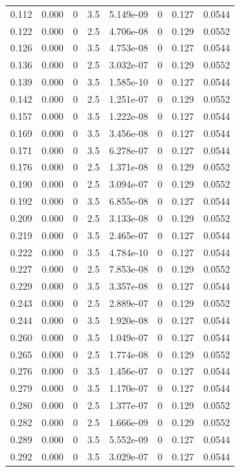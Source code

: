 \documentclass[preview]{standalone}
\begin{document}
{{\begin{tabular}{L{1.2cm}C{1.2cm} C{0.3cm}C{0.5cm} C{1.4cm}C{1.4cm} C{1.4cm}C{1.4cm}}
  0.112  &  0.000  & 0     & 3.5 &  5.149e-09  & 0  & 0.127 &  0.0544   \\ 
  0.122  &  0.000  & 0     & 2.5 &  4.706e-08  & 0  & 0.129 &  0.0552   \\ 
  0.126  &  0.000  & 0     & 3.5 &  4.753e-08  & 0  & 0.127 &  0.0544   \\ 
  0.136  &  0.000  & 0     & 2.5 &  3.032e-07  & 0  & 0.129 &  0.0552   \\ 
  0.139  &  0.000  & 0     & 3.5 &  1.585e-10  & 0  & 0.127 &  0.0544   \\ 
  0.142  &  0.000  & 0     & 2.5 &  1.251e-07  & 0  & 0.129 &  0.0552   \\ 
  0.157  &  0.000  & 0     & 3.5 &  1.222e-08  & 0  & 0.127 &  0.0544   \\ 
  0.169  &  0.000  & 0     & 3.5 &  3.456e-08  & 0  & 0.127 &  0.0544   \\ 
  0.171  &  0.000  & 0     & 3.5 &  6.278e-07  & 0  & 0.127 &  0.0544   \\ 
  0.176  &  0.000  & 0     & 2.5 &  1.371e-08  & 0  & 0.129 &  0.0552   \\ 
  0.190  &  0.000  & 0     & 2.5 &  3.094e-07  & 0  & 0.129 &  0.0552   \\ 
  0.192  &  0.000  & 0     & 3.5 &  6.855e-08  & 0  & 0.127 &  0.0544   \\ 
  0.209  &  0.000  & 0     & 2.5 &  3.133e-08  & 0  & 0.129 &  0.0552   \\ 
  0.219  &  0.000  & 0     & 3.5 &  2.465e-07  & 0  & 0.127 &  0.0544   \\ 
  0.222  &  0.000  & 0     & 3.5 &  4.784e-10  & 0  & 0.127 &  0.0544   \\ 
  0.227  &  0.000  & 0     & 2.5 &  7.853e-08  & 0  & 0.129 &  0.0552   \\ 
  0.229  &  0.000  & 0     & 3.5 &  3.357e-08  & 0  & 0.127 &  0.0544   \\ 
  0.243  &  0.000  & 0     & 2.5 &  2.889e-07  & 0  & 0.129 &  0.0552   \\ 
  0.244  &  0.000  & 0     & 3.5 &  1.920e-08  & 0  & 0.127 &  0.0544   \\ 
  0.260  &  0.000  & 0     & 3.5 &  1.049e-07  & 0  & 0.127 &  0.0544   \\ 
  0.265  &  0.000  & 0     & 2.5 &  1.774e-08  & 0  & 0.129 &  0.0552   \\ 
  0.276  &  0.000  & 0     & 3.5 &  1.456e-07  & 0  & 0.127 &  0.0544   \\ 
  0.279  &  0.000  & 0     & 3.5 &  1.170e-07  & 0  & 0.127 &  0.0544   \\ 
  0.280  &  0.000  & 0     & 2.5 &  1.377e-07  & 0  & 0.129 &  0.0552   \\ 
  0.282  &  0.000  & 0     & 2.5 &  1.666e-09  & 0  & 0.129 &  0.0552   \\ 
  0.289  &  0.000  & 0     & 3.5 &  5.552e-09  & 0  & 0.127 &  0.0544   \\ 
  0.292  &  0.000  & 0     & 3.5 &  3.029e-07  & 0  & 0.127 &  0.0544   \\ 
\hline 
\end{tabular} 

}}
\end{document}
